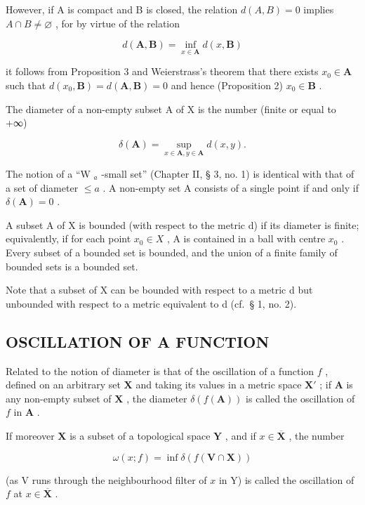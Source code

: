 However, if A is compact and B is closed, the relation \(d(A, B) = 0\) implies \(A \cap B \neq \varnothing\) , for by virtue of the relation

\[
d (\mathbf {A}, \mathbf {B}) = \inf _ {x \in \mathbf {A}} d (x, \mathbf {B})
\]

it follows from Proposition 3 and Weierstrass's theorem that there exists \(x_0 \in \mathbf{A}\) such that \(d(x_0, \mathbf{B}) = d(\mathbf{A}, \mathbf{B}) = 0\) and hence (Proposition 2) \(x_0 \in \mathbf{B}\) .

The diameter of a non-empty subset A of X is the number (finite or equal to +∞)

\[
\delta (\mathbf {A}) = \sup _ {x \in \mathbf {A}, y \in \mathbf {A}} d (x, y).
\]

The notion of a ``W \(_{a}\) -small set'' (Chapter II, § 3, no. 1) is identical with that of a set of diameter \(\leqslant a\) . A non-empty set A consists of a single point if and only if \(\delta(\mathbf{A}) = 0\) .

A subset A of X is bounded (with respect to the metric d) if its diameter is finite; equivalently, if for each point \(x_{0} \in X\) , A is contained in a ball with centre \(x_{0}\) . Every subset of a bounded set is bounded, and the union of a finite family of bounded sets is a bounded set.

Note that a subset of X can be bounded with respect to a metric d but unbounded with respect to a metric equivalent to d (cf.~§ 1, no. 2).

\subsection{OSCILLATION OF A FUNCTION}

Related to the notion of diameter is that of the oscillation of a function \(f\) , defined on an arbitrary set \(\mathbf{X}\) and taking its values in a metric space \(\mathbf{X}'\) ; if \(\mathbf{A}\) is any non-empty subset of \(\mathbf{X}\) , the diameter \(\delta(f(\mathbf{A}))\) is called the oscillation of \(f\) in \(\mathbf{A}\) .

If moreover \(\mathbf{X}\) is a subset of a topological space \(\mathbf{Y}\) , and if \(x \in \overline{\mathbf{X}}\) , the number

\[
\omega (x; f) = \inf \delta (f (\mathbf {V} \cap \mathbf {X}))
\]

(as V runs through the neighbourhood filter of \(x\) in Y) is called the oscillation of \(f\) at \(x \in \overline{\mathbf{X}}\) .

